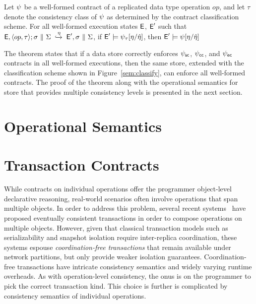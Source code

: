 \begin{theorem}
\label{thm:classification-sound}
Let $\psi$ be a well-formed contract of a replicated data type operation
$\mathit{op}$, and let $\tau$ denote the consistency class of $\psi$ as
determined by the contract classification scheme. For all well-formed execution
states ${\normalfont \textsf{E}}$, ${\normalfont \textsf{E}}'$ such that
${\normalfont \textsf{E}},\langle op,\tau \rangle;\sigma ~\|~ \Sigma \;\xhookrightarrow{\eta}\; {\normalfont \textsf{E}}', \sigma
~\|~ \Sigma$, if ${\normalfont \textsf{E}}' \models \psi_\tau[\eta/\hat{\eta}]$, then ${\normalfont \textsf{E}}' \models
\psi[\eta/\hat{\eta}]$
\end{theorem}

\noindent The theorem states that if a data store correctly enforces $\psi_{\sf sc}$,
$\psi_{\sf cc}$, and $\psi_{\sf ec}$ contracts in all well-formed executions, then the same
store, extended with the classification scheme shown in
Figure~\ref{sem:classify}, can enforce all well-formed \quelea contracts. The
proof of the theorem along with the operational semantics for store that
provides multiple consistency levels is presented in the next section.

\section{Operational Semantics}
\label{q_sec:meta-theory}

\section{Transaction Contracts}
\label{q_sec:txns}

While contracts on individual operations offer the programmer object-level
declarative reasoning, real-world scenarios often involve operations that span
multiple objects. In order to address this problem, several recent
systems~\cite{Walter,Burckhardt2012,BailisHAT} have proposed eventually
consistent transactions in order to compose operations on multiple objects.
However, given that classical transaction models such as serializability and
snapshot isolation require inter-replica coordination, these systems espouse
\emph{coordination-free transactions} that remain available under network
partitions, but only provide weaker isolation guarantees. Coordination-free
transactions have intricate consistency semantics and widely varying runtime
overheads. As with operation-level consistency, the onus is on the programmer
to pick the correct transaction kind. This choice is further is complicated by
consistency semantics of individual operations.

